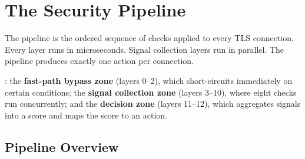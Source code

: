 
\chapter{The Security Pipeline}
\label{ch:pipeline}

\begin{chapterquote}
The pipeline is the ordered sequence of checks applied to every TLS connection.
Every layer runs in microseconds. Signal collection layers run in parallel.
The pipeline produces exactly one action per connection.
\end{chapterquote}

: the \textbf{fast-path bypass zone} (layers 0–2),
which short-circuits immediately on certain conditions; the \textbf{signal collection zone}
(layers 3–10), where eight checks run concurrently; and the \textbf{decision zone}
(layers 11–12), which aggregates signals into a score and maps the score to an action.

\section{Pipeline Overview}


